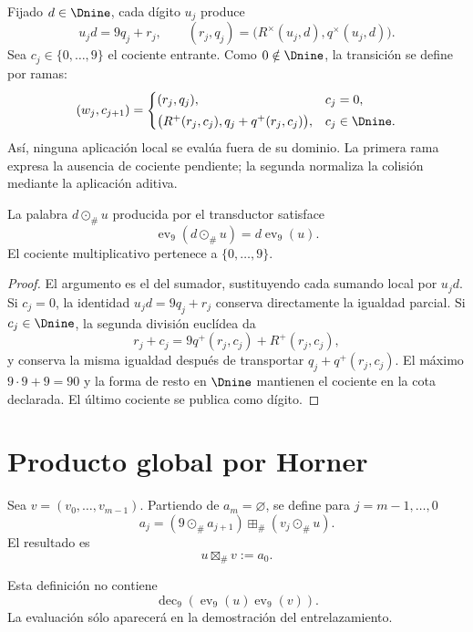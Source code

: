 \begin{algorithm}
Fijado $d\in\Dnine$, cada dígito $u_j$ produce
\[
 u_jd=9q_j+r_j,
 \qquad
 (r_j,q_j)=\bigl(R^\times(u_j,d),q^\times(u_j,d)\bigr).
\]
Sea $c_j\in\{0,\ldots,9\}$ el cociente entrante. Como $0\notin\Dnine$,
la transición se define por ramas:
\[
 (w_j,c_{j+1})=
 \begin{cases}
 (r_j,q_j),&c_j=0,\\[1mm]
 \bigl(R^+(r_j,c_j),q_j+q^+(r_j,c_j)\bigr),&c_j\in\Dnine.
 \end{cases}
\]
Así, ninguna aplicación local se evalúa fuera de su dominio. La primera
rama expresa la ausencia de cociente pendiente; la segunda normaliza la
colisión mediante la aplicación aditiva.
\end{algorithm}

\begin{lemma}
La palabra $d\odot_\#u$ producida por el transductor satisface
\[
 \operatorname{ev}_9(d\odot_\#u)
 =d\operatorname{ev}_9(u).
\]
El cociente multiplicativo pertenece a $\{0,\ldots,9\}$.
\end{lemma}

\begin{proof}
El argumento es el del sumador, sustituyendo cada sumando local por
$u_jd$. Si $c_j=0$, la identidad
$u_jd=9q_j+r_j$ conserva directamente la igualdad parcial. Si
$c_j\in\Dnine$, la segunda división euclídea da
\[
 r_j+c_j=9q^+(r_j,c_j)+R^+(r_j,c_j),
\]
y conserva la misma igualdad después de transportar
$q_j+q^+(r_j,c_j)$. El máximo $9\cdot9+9=90$ y la forma de resto en
$\Dnine$ mantienen el cociente en la cota declarada. El último cociente se
publica como dígito.
\end{proof}

\section{Producto global por Horner}

\begin{definition}
Sea $v=(v_0,\ldots,v_{m-1})$. Partiendo de $a_m=\varnothing$, se define para
$j=m-1,\ldots,0$
\[
 a_j=(9\odot_\#a_{j+1})\boxplus_\#(v_j\odot_\#u).
\]
El resultado es
\[
 u\boxtimes_\#v:=a_0.
\]
\end{definition}

Esta definición no contiene
\[
 \operatorname{dec}_9(\operatorname{ev}_9(u)\operatorname{ev}_9(v)).
\]
La evaluación sólo aparecerá en la demostración del entrelazamiento.

